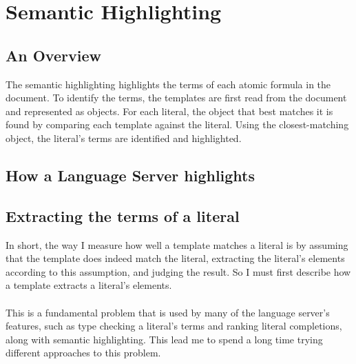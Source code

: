 \documentclass[../main.tex]{subfiles}
\begin{document}
\section{Semantic Highlighting}
\subsection{An Overview}
The semantic highlighting highlights the terms of each atomic formula in the document. To identify the terms, the templates are first read from the document and represented as  objects. For each literal, the  object that best matches it is found by comparing each template against the literal. Using the closest-matching  object, the literal's terms are identified and highlighted.

\subsection{How a Language Server highlights}


\subsection{Extracting the terms of a literal}
In short, the way I measure how well a template matches a literal is by assuming that the template does indeed match the literal, extracting the literal's elements according to this assumption, and judging the result. So I must first describe how a template extracts a literal's elements.
\\ 
\\
This is a fundamental problem that is used by many of the language server's features, such as type checking a literal's terms and ranking literal completions, along with semantic highlighting. This lead me to spend a long time trying different approaches to this problem.
\end{document}
